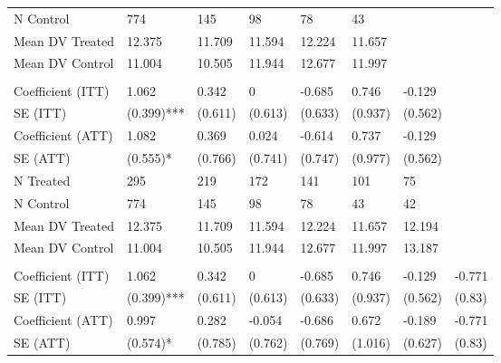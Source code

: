 \begin{table}[!h]
\begin{threeparttable}
\begin{tabular}[t]{llllllll}
\hspace{1em}N Control & 774 & 145 & 98 & 78 & 43 &  & \\
\hspace{1em}Mean DV Treated & 12.375 & 11.709 & 11.594 & 12.224 & 11.657 &  & \\
\hspace{1em}Mean DV Control & 11.004 & 10.505 & 11.944 & 12.677 & 11.997 &  & \\
\addlinespace[0.3em]
\multicolumn{8}{l}{\textbf{Panel C: t* = 6}}\\
\hspace{1em}Coefficient (ITT) & 1.062 & 0.342 & 0 & -0.685 & 0.746 & -0.129 & \\
\hspace{1em}SE (ITT) & (0.399)*** & (0.611) & (0.613) & (0.633) & (0.937) & (0.562) & \\
\hspace{1em}Coefficient (ATT) & 1.082 & 0.369 & 0.024 & -0.614 & 0.737 & -0.129 & \\
\hspace{1em}SE (ATT) & (0.555)* & (0.766) & (0.741) & (0.747) & (0.977) & (0.562) & \\
\hspace{1em}N Treated & 295 & 219 & 172 & 141 & 101 & 75 & \\
\hspace{1em}N Control & 774 & 145 & 98 & 78 & 43 & 42 & \\
\hspace{1em}Mean DV Treated & 12.375 & 11.709 & 11.594 & 12.224 & 11.657 & 12.194 & \\
\hspace{1em}Mean DV Control & 11.004 & 10.505 & 11.944 & 12.677 & 11.997 & 13.187 & \\
\addlinespace[0.3em]
\multicolumn{8}{l}{\textbf{Panel D: t* = 7}}\\
\hspace{1em}Coefficient (ITT) & 1.062 & 0.342 & 0 & -0.685 & 0.746 & -0.129 & -0.771\\
\hspace{1em}SE (ITT) & (0.399)*** & (0.611) & (0.613) & (0.633) & (0.937) & (0.562) & (0.83)\\
\hspace{1em}Coefficient (ATT) & 0.997 & 0.282 & -0.054 & -0.686 & 0.672 & -0.189 & -0.771\\
\hspace{1em}SE (ATT) & (0.574)* & (0.785) & (0.762) & (0.769) & (1.016) & (0.627) & (0.83)\\

\end{tabular}
\end{threeparttable}
\end{table}
